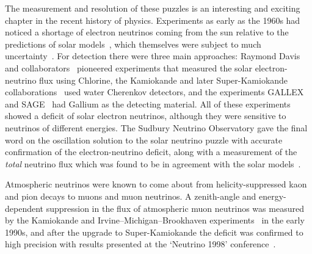   The measurement and resolution of these puzzles is an interesting and exciting
  chapter in the recent history of physics. Experiments as early as the 1960s
  had noticed a shortage of electron neutrinos coming from the sun relative to
  the predictions of solar models~\cite{RevModPhys.60.297, 1988ApJ...335..415T,
    RevModPhys.64.885, RevModPhys.67.781}, which themselves were subject to much
  uncertainty~\cite{Morrison:1992bz}. For detection there were three main
  approaches: Raymond Davis and collaborators~\cite{PhysRevLett.12.303}
  pioneered experiments that measured the solar electron-neutrino flux using
  Chlorine, the Kamiokande and later Super-Kamiokande
  collaborations~\cite{Hirata:1989zj, Hirata:1990xa} used water Cherenkov
  detectors, and the experiments GALLEX~\cite{Hampel:1998xg} and
  SAGE~\cite{Abdurashitov:1999zd} had Gallium as the detecting material. All of
  these experiments showed a deficit of solar electron neutrinos, although they
  were sensitive to neutrinos of different energies. The Sudbury Neutrino
  Observatory gave the final word on the oscillation solution to the solar
  neutrino puzzle with accurate confirmation of the electron-neutrino deficit,
  along with a measurement of the \textit{total} neutrino flux which was found
  to be in agreement with the solar models~\cite{Ahmad:2001an, Ahmad:2002jz}.

  Atmospheric neutrinos were known to come about from helicity-suppressed kaon
  and pion decays to muons and muon neutrinos. A zenith-angle and
  energy-dependent suppression in the flux of atmospheric muon neutrinos was
  measured by the Kamiokande and Irvine--Michigan--Brookhaven
  experiments~\cite{Hirata:1992ku, BeckerSzendy:1995vr} in the early 1990s, and
  after the upgrade to Super-Kamiokande the deficit was confirmed to high
  precision with results presented at the `Neutrino 1998'
  conference~\cite{Fukuda:1998mi, vonFeilitzsch:2003mh, shiozawa:2002,
    Smy:2002rz}.

